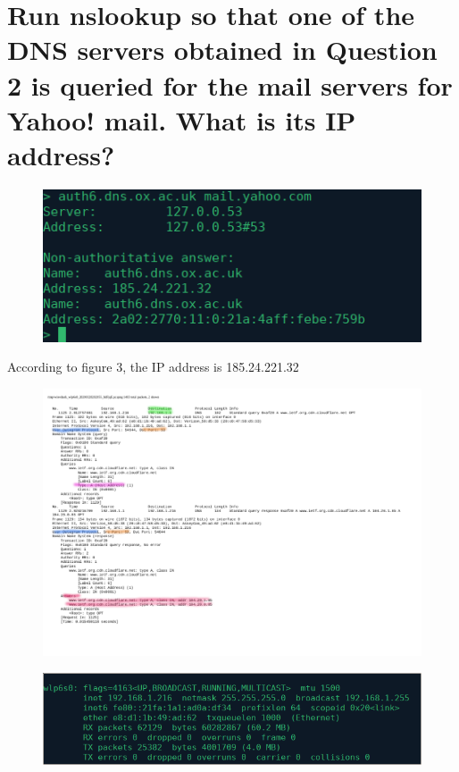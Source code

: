 \documentclass{article}
\begin{document}
\section{Run nslookup so that one of the DNS servers obtained in Question 2 is queried for
the mail servers for Yahoo! mail. What is its IP address?}

\begin{figure}[h!]
\centering
\includegraphics[scale=0.65]{Q3.png}
\caption{}
\end{figure}

According to figure 3, the IP address is 185.24.221.32\\

\begin{figure}[h!]
\centering
\includegraphics[scale=0.7]{Q4-8.pdf}
\caption{}
\end{figure}

\clearpage

\begin{figure}[h!]
\centering
\includegraphics[scale=0.7]{ifconfig.png}
\caption{}
\end{figure}
\end{document}
